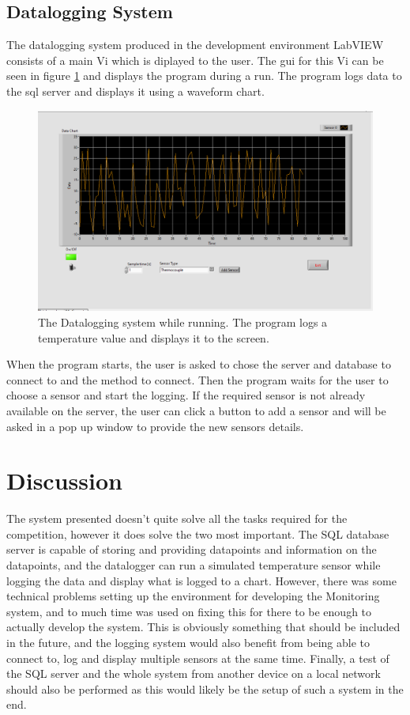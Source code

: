 \documentclass[11pt, A4paper, english]{article}
\begin{document}
{		\subsection{Datalogging System}
The datalogging system produced in the development environment LabVIEW consists of a main Vi which is diplayed to the user. The gui for this Vi can be seen in figure \ref{Main} and displays the program during a run. The program logs data to the sql server and displays it using a waveform chart.
			\begin{figure}
\includegraphics[width=0.9\linewidth]{Images/DaqRunning.png}
\caption{The Datalogging system while running. The program logs a temperature value and displays it to the screen.}
\label{Main}
			\end{figure}
When the program starts, the user is asked to chose the server and database to connect to and the method to connect. Then the program waits for the user to choose a sensor and start the logging. If the required sensor is not already available on the server, the user can click a button to add a sensor and will be asked in a pop up window to provide the new sensors details.

	\section{Discussion}
The system presented doesn't quite solve all the tasks required for the competition, however it does solve the two most important. The SQL database server is capable of storing and providing datapoints and information on the datapoints, and the datalogger can run a simulated temperature sensor while logging the data and display what is logged to a chart. However, there was some technical problems setting up the environment for developing the Monitoring system, and to much time was used on fixing this for there to be enough to actually develop the system. This is obviously something that should be included in the future, and the logging system would also benefit from being able to connect to, log and display multiple sensors at the same time. Finally, a test of the SQL server and the whole system from another device on a local network should also be performed as this would likely be the setup of such a system in the end.

}
\end{document}
